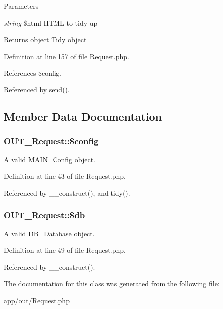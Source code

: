 \begin{DoxyParams}{Parameters}
\item[{\em string}]\$html HTML to tidy up\end{DoxyParams}
\begin{DoxyReturn}{Returns}
object Tidy object 
\end{DoxyReturn}


Definition at line 157 of file Request.php.

References \$config.

Referenced by send().

\subsection{Member Data Documentation}
\hypertarget{classOUT__Request_a628de0ecf0318ef0459d1b1986bf2586}{
\subsubsection[{\$config}]{\setlength{\rightskip}{0pt plus 5cm}OUT\_\-Request::\$config}}
\label{de/d53/classOUT__Request_a628de0ecf0318ef0459d1b1986bf2586}
A valid \hyperlink{classMAIN__Config}{MAIN\_\-Config} object. 

Definition at line 43 of file Request.php.

Referenced by \_\-\_\-construct(), and tidy().\hypertarget{classOUT__Request_ae2aa3cf43543978530ee50af4433f954}{
\subsubsection[{\$db}]{\setlength{\rightskip}{0pt plus 5cm}OUT\_\-Request::\$db}}
\label{de/d53/classOUT__Request_ae2aa3cf43543978530ee50af4433f954}
A valid \hyperlink{classDB__Database}{DB\_\-Database} object. 

Definition at line 49 of file Request.php.

Referenced by \_\-\_\-construct().

The documentation for this class was generated from the following file:\begin{DoxyCompactItemize}
\item 
app/out/\hyperlink{Request_8php}{Request.php}\end{DoxyCompactItemize}
